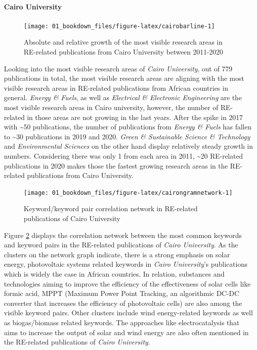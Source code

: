 \documentclass[
]{book}
\begin{document}
\hypertarget{cairo-university}{%
\paragraph{Cairo University}\label{cairo-university}}

\begin{figure}
\texttt{[image: 01\_bookdown\_files/figure-latex/cairobarline-1]} \caption{Absolute and relative growth of the most visible research areas in RE-related publications from Cairo University between 2011-2020}\label{fig:cairobarline}
\end{figure}

Looking into the most visible research areas of \emph{Cairo University}, out of 779 publications in total, the most visible research areas are aligning with the most visible research areas in RE-related publications from African countries in general. \emph{Energy \& Fuels}, as well as \emph{Electrical \& Electronic Engineering} are the most visible research areas in Cairo university, however, the number of RE-related in those areas are not growing in the last years. After the spike in 2017 with \textasciitilde50 publications, the number of publications from \emph{Energy \& Fuels} has fallen to \textasciitilde30 publications in 2019 and 2020. \emph{Green \& Sustainable Science \& Technology} and \emph{Environmental Sciences} on the other hand display relatively steady growth in numbers. Considering there was only 1 from each area in 2011, \textasciitilde20 RE-related publications in 2020 makes those the fastest growing research areas in the RE-related publications from Cairo University.

\begin{figure}
\texttt{[image: 01\_bookdown\_files/figure-latex/cairongramnetwork-1]} \caption{Keyword/keyword pair correlation network in RE-related publications of Cairo University}\label{fig:cairongramnetwork}
\end{figure}

Figure \ref{fig:cairongramnetwork} displays the correlation network between the most common keywords and keyword pairs in the RE-related publications of \emph{Cairo University}. As the clusters on the network graph indicate, there is a strong emphasis on solar energy, photovoltaic systems related keywords in \emph{Cairo University}'s publications which is widely the case in African countries. In relation, substances and technologies aiming to improve the efficiency of the effectiveness of solar cells like formic acid, MPPT (Maximum Power Point Tracking, an algorithmic DC-DC converter that increases the efficiency of photovoltaic cells) are also among the visible keyword pairs. Other clusters include wind energy-related keywords as well as biogas/biomass related keywords. The approaches like electrocatalysis that aims to increase the output of solar and wind energy are also often mentioned in the RE-related publications of \emph{Cairo University}.
\end{document}

